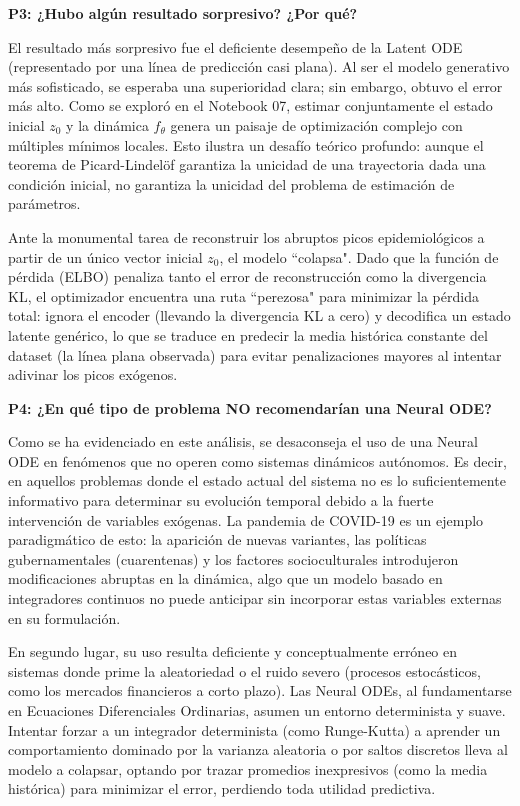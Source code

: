 \documentclass[12pt]{article}
\begin{document}
\textbf{P3: ¿Hubo algún resultado sorpresivo? ¿Por qué?}

El resultado más sorpresivo fue el deficiente desempeño de la Latent ODE (representado por una línea de predicción casi plana). Al ser el modelo generativo más sofisticado, se esperaba una superioridad clara; sin embargo, obtuvo el error más alto. Como se exploró en el Notebook 07, estimar conjuntamente el estado inicial $z_0$ y la dinámica $f_\theta$ genera un paisaje de optimización complejo con múltiples mínimos locales. Esto ilustra un desafío teórico profundo: aunque el teorema de Picard-Lindelöf garantiza la unicidad de una trayectoria dada una condición inicial, no garantiza la unicidad del problema de estimación de parámetros.

Ante la monumental tarea de reconstruir los abruptos picos epidemiológicos a partir de un único vector inicial $z_0$, el modelo ``colapsa". Dado que la función de pérdida (ELBO) penaliza tanto el error de reconstrucción como la divergencia KL, el optimizador encuentra una ruta ``perezosa" para minimizar la pérdida total: ignora el encoder (llevando la divergencia KL a cero) y decodifica un estado latente genérico, lo que se traduce en predecir la media histórica constante del dataset (la línea plana observada) para evitar penalizaciones mayores al intentar adivinar los picos exógenos.

\textbf{P4: ¿En qué tipo de problema NO recomendarían una Neural ODE?}

Como se ha evidenciado en este análisis, se desaconseja el uso de una Neural ODE en fenómenos que no operen como sistemas dinámicos autónomos. Es decir, en aquellos problemas donde el estado actual del sistema no es lo suficientemente informativo para determinar su evolución temporal debido a la fuerte intervención de variables exógenas. La pandemia de COVID-19 es un ejemplo paradigmático de esto: la aparición de nuevas variantes, las políticas gubernamentales (cuarentenas) y los factores socioculturales introdujeron modificaciones abruptas en la dinámica, algo que un modelo basado en integradores continuos no puede anticipar sin incorporar estas variables externas en su formulación.

En segundo lugar, su uso resulta deficiente y conceptualmente erróneo en sistemas donde prime la aleatoriedad o el ruido severo (procesos estocásticos, como los mercados financieros a corto plazo). Las Neural ODEs, al fundamentarse en Ecuaciones Diferenciales Ordinarias, asumen un entorno determinista y suave. Intentar forzar a un integrador determinista (como Runge-Kutta) a aprender un comportamiento dominado por la varianza aleatoria o por saltos discretos lleva al modelo a colapsar, optando por trazar promedios inexpresivos (como la media histórica) para minimizar el error, perdiendo toda utilidad predictiva.
\end{document}
